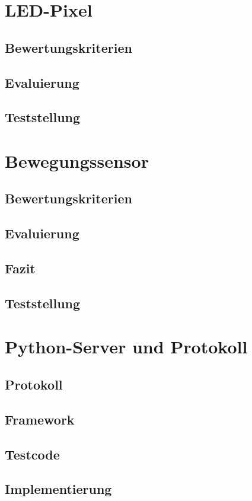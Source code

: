\documentclass[12pt,a4paper]{scrreprt}
\begin{document}
\section{LED-Pixel}
\subsection{Bewertungskriterien}
\subsection{Evaluierung}
\subsection{Teststellung}

\section{Bewegungssensor}
\subsection{Bewertungskriterien}
\subsection{Evaluierung}
\subsection{Fazit}
\subsection{Teststellung}

\section{Python-Server und Protokoll}
\subsection{Protokoll}
\subsection{Framework}
\subsection{Testcode}
\subsection{Implementierung}
\end{document}

